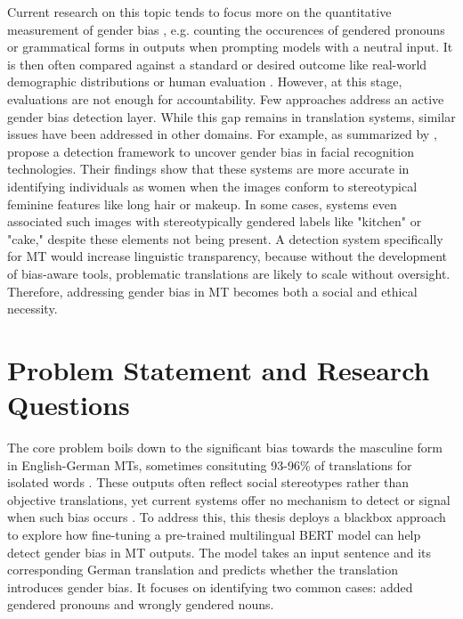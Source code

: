 Current research on this topic tends to focus more on the quantitative measurement of gender bias \citep{rescignoGenderBiasMachine2023,barclayInvestigatingMarkersDrivers2024a,smacchiaDoesAIReflect2024}, e.g. counting the occurences of gendered pronouns or grammatical forms in outputs when prompting models with a neutral input. It is then often compared against a standard or desired outcome like real-world demographic distributions \citep{smacchiaDoesAIReflect2024,pratesAssessingGenderBias2019} or human evaluation \citep{lardelliBuildingBridgesDataset2024,savoldiWhatHarmQuantifying2024}. However, at this stage, evaluations are not enough for accountability. Few approaches address an active gender bias detection layer. While this gap remains in translation systems, similar issues have been addressed in other domains. For example, as summarized by \citet{shresthaExploringGenderBiases2022}, \citet{schwemmerDiagnosingGenderBias2020} propose a detection framework to uncover gender bias in facial recognition technologies. Their findings show that these systems are more accurate in identifying individuals as women when the images conform to stereotypical feminine features like long hair or makeup. In some cases, systems even associated such images with stereotypically gendered labels like "kitchen" or "cake," despite these elements not being present. 
A detection system specifically for MT would increase linguistic transparency, because without the development of bias-aware tools, problematic translations are likely to scale without oversight. Therefore, addressing gender bias in MT becomes both a social and ethical necessity.

\section{Problem Statement and Research Questions}

The core problem boils down to the significant bias towards the masculine form in English-German MTs, sometimes consituting 93-96\% of translations for isolated words \citep{lardelliBuildingBridgesDataset2024}. These outputs often reflect social stereotypes rather than objective translations, yet current systems offer no mechanism to detect or signal when such bias occurs \citep{rescignoGenderBiasMachine2023}. To address this, this thesis deploys a blackbox approach to explore how fine-tuning a pre-trained multilingual BERT model can help detect gender bias in MT outputs. The model takes an input sentence and its corresponding German translation and predicts whether the translation introduces gender bias. It focuses on identifying two common cases: added gendered pronouns and wrongly gendered nouns.

